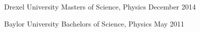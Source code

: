 

\begin{cventries}


  \cventry
    {Drexel University} %
    {Masters of Science, Physics} %
    {} %
    {December 2014} %
    {}

  \vspace{.5em}
  
  \cventry
    {Baylor University} %
    {Bachelors of Science, Physics} %
    {} %
    {May 2011} %
    {}
\end{cventries}
